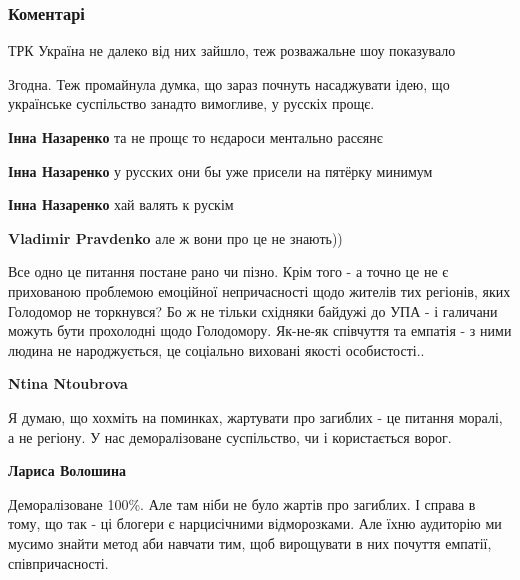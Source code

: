  
 
 
 
 
\subsubsection{Коментарі}

\begin{itemize} %
ТРК Україна не далеко від них зайшло, теж розважальне шоу показувало

Згодна. Теж промайнула думка, що зараз почнуть насаджувати ідею, що українське суспільство занадто вимогливе, у русскіх прощє.

\begin{itemize} %
\textbf{Інна Назаренко} та не прощє то нєдароси ментально расєянє

\textbf{Інна Назаренко} у русских они бы уже присели на пятёрку минимум

\textbf{Інна Назаренко} хай валять к рускім

\textbf{Vladimir Pravdenko} але ж вони про це не знають))
\end{itemize} %


Все одно це питання постане рано чи пізно. Крім того - а точно це не є
прихованою проблемою емоційної непричасності щодо жителів тих регіонів, яких
Голодомор не торкнувся? Бо ж не тільки східняки байдужі до УПА - і галичани
можуть бути прохолодні щодо Голодомору. Як-не-як співчуття та емпатія - з ними
людина не народжується, це соціально виховані якості особистості..

\begin{itemize} %
\textbf{Ntina Ntoubrova} 

Я думаю, що хохміть на поминках, жартувати про загиблих - це питання моралі, а
не регіону. У нас деморалізоване суспільство, чи і користається ворог.

\textbf{Лариса Волошина} 

Деморалізоване 100\%. Але там ніби не було жартів про загиблих. І справа в тому,
що так - ці блогери є нарцисічними відморозками. Але їхню аудиторію ми мусимо
знайти метод аби навчати тим, щоб вирощувати в них почуття емпатії,
співпричасності.


\end{itemize}
\end{itemize}
